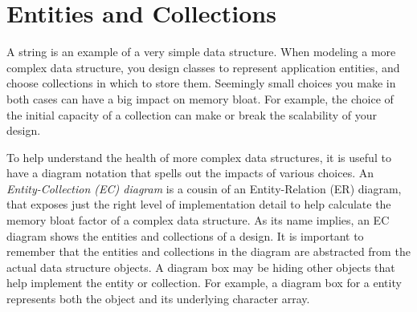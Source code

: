 \section{Entities and Collections}

A string is an example of a very simple data structure.  When
modeling a more complex data structure, you design classes to
represent application entities, and choose collections in which to
store them. Seemingly small choices you make in both cases can have a
big impact on memory bloat. For example, the choice of the initial
capacity of a collection can make or break the scalability of your
design. 

To help understand the health of more complex data structures, it is useful to
have a diagram notation that spells out the impacts of various choices.  An
\emph{Entity-Collection (EC) diagram} is a cousin of an Entity-Relation (ER)
diagram, that exposes just the right level of implementation
detail to help calculate the memory bloat factor of a complex data structure. 
As its name implies, an EC
diagram shows the entities and collections of a design. It is important to
remember that the entities and collections in the diagram are abstracted from
the actual data structure objects. A diagram box may be hiding other objects
that help implement the entity or collection. For example, a diagram box for a
 entity represents both the  object and its
underlying character array.

